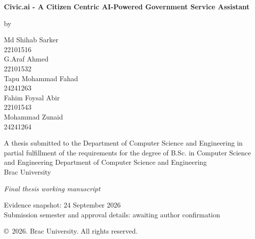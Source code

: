\begin{titlepage}\begin{center}
\vspace*{12mm}
{\fontsize{16}{21}\selectfont\bfseries Civic.ai - A Citizen Centric AI-Powered Government Service Assistant\par}
\vspace{12mm}by\par\vspace{6mm}
Md Shihab Sarker\\22101516\\
G.Araf Ahmed\\22101532\\
Tapu Mohammad Fahad\\24241263\\
Fahim Foysal Abir\\22101543\\
Mohammad Zunaid\\24241264
\vspace{12mm}

A thesis submitted to the Department of Computer Science and Engineering
in partial fulfillment of the requirements for the degree of
B.Sc. in Computer Science and Engineering
\vfill
Department of Computer Science and Engineering\\Brac University
\vspace{5mm}

\textit{Final thesis working manuscript}\par
Evidence snapshot: 24 September 2026\\
Submission semester and approval details: awaiting author confirmation
\vspace{5mm}

\copyright\ 2026. Brac University. All rights reserved.
\end{center}\end{titlepage}
